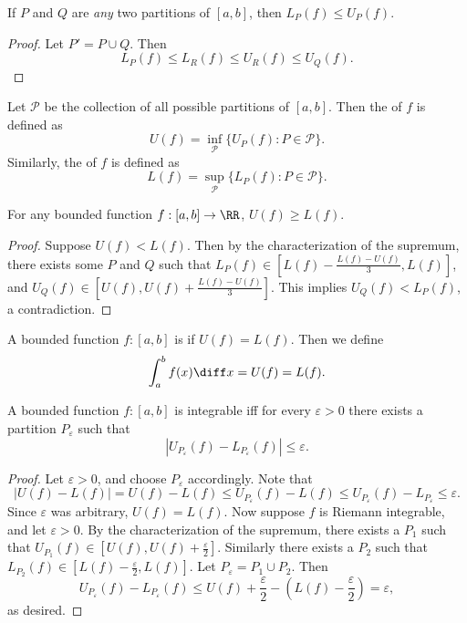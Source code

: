 \begin{lemma*}
If $P$ and $Q$ are \emph{any} two partitions of $[a,b]$, then $L_P(f) \leq U_P(f)$. 
\end{lemma*}
\begin{proof}
Let $P' = P \cup Q$. Then 
\[ L_P(f) \leq L_R(f) \leq U_R(f) \leq U_Q(f). \]
\end{proof}

\begin{definition}
Let $\mathcal{P}$ be the collection of all possible partitions of $[a,b]$. Then the  of $f$ is defined as 
\[ U(f) = \inf\limits_\mathcal{P} \{U_P(f): P \in \mathcal{P} \}. \]
Similarly, the  of $f$ is defined as 
\[ L(f) = \sup\limits_\mathcal{P} \{L_P(f) : P \in \mathcal{P} \}. \]
\end{definition}

\begin{proposition*}
For any bounded function $f: [a,b] \to \RR$, $U(f) \geq L(f)$. 
\end{proposition*}
\begin{proof}
Suppose $U(f) < L(f)$. Then by the characterization of the supremum, there exists some $P$ and $Q$ such that $L_P(f) \in [L(f) - \frac{L(f) - U(f)}{3}, L(f)]$, and $U_Q(f) \in [U(f), U(f) + \frac{L(f) - U(f)}{3}]$. This implies $U_Q(f) < L_P(f)$, a contradiction. 
\end{proof}

\begin{definition}
A bounded function $f : [a,b]$ is  if $U(f) = L(f)$. Then we define 
\[ \int_a^b f(x) \diff x = U(f) = L(f). \]
\end{definition}

\begin{lemma}
A bounded function $f : [a,b]$ is integrable iff for every $\varepsilon > 0$ there exists a partition $P_\varepsilon$ such that 
\[ | U_{P_\varepsilon}(f) - L_{P_\varepsilon}(f)| \leq \varepsilon. \]
\end{lemma}
\begin{proof}
Let $\varepsilon > 0$, and choose $P_\varepsilon$ accordingly. Note that $$|U(f) - L(f)| = U(f) - L(f) \leq U_{P_\varepsilon}(f) - L(f) \leq U_{P_\varepsilon}(f) - L_{P_\varepsilon} \leq \varepsilon.$$ Since $\varepsilon$ was arbitrary, $U(f) = L(f)$. 
\newline\newline
Now suppose $f$ is Riemann integrable, and let $\varepsilon > 0$. By the characterization of the supremum, there exists a $P_1$ such that $U_{P_1}(f) \in [U(f), U(f) + \frac{\varepsilon}{2}]$. Similarly there exists a $P_2$ such that $L_{P_2}(f) \in [L(f) - \frac{\varepsilon}{2}, L(f)]$. Let $P_\varepsilon = P_1 \cup P_2$. Then  
\[ U_{P_\varepsilon}(f) - L_{P_\varepsilon}(f) \leq U(f) + \dfrac{\varepsilon}{2} -(L(f) - \dfrac{\varepsilon}{2}) = \varepsilon, \] as desired. 
\end{proof}

